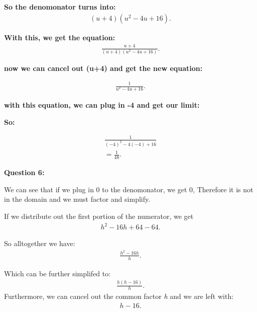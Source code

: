 \documentclass{report}
\begin{document}
    \bigbreak \noindent 
    \textbf{So the denomonator turns into:}
    \begin{align*}
        \left(u+4\right) \left(u^2-4u+16\right)
    .\end{align*}

    \bigbreak \noindent 
    \textbf{With this, we get the equation:}
    \begin{align*}
        \frac{u+4}{ \left(u+4\right) \left(u^2-4u+16\right)}
    .\end{align*}

    \bigbreak \noindent 
    \textbf{now we can cancel out (u+4) and get the new equation:} 

    \begin{align*}
        \frac{1}{u^2-4u+16}
    .\end{align*}

    \bigbreak \noindent 
    \textbf{with this equation, we can plug in -4 and get our limit:}

    \bigbreak \noindent 
    \textbf{So:}

    \begin{align*}
        \frac{1}{ \left(-4\right)^2-4 \left(-4\right)+16} \\ 
        = \frac{1}{48}
    .\end{align*}

    \bigbreak \noindent \bigbreak \noindent 
    \begin{Large}
       \textbf{Question 6:} 
    \end{Large}

    \bigbreak \noindent 
    \noindent We can see that if we plug in 0 to the denomonator, we get 0, Therefore it is
    not in the domain and we must factor and simplify.

    \bigbreak \noindent 
    If we distribute out the first portion of the numerator, we get
    \begin{align*}
       h^2-16h+64 - 64
    .\end{align*}
    
    \bigbreak \noindent 
    So alltogether we have:
    \begin{align*}
        \frac{h^2-16h}{h}
    .\end{align*}

    \bigbreak \noindent 
    Which can be further simplifed to:
    \begin{align*}
       \frac{h \left(h-16\right)}{h} 
    .\end{align*}
    \bigbreak \noindent 
    Furthermore, we can cancel out the common factor \textit{h} and we are left with:
    \begin{align*}
       h-16 
    .\end{align*}
    
\end{document}

